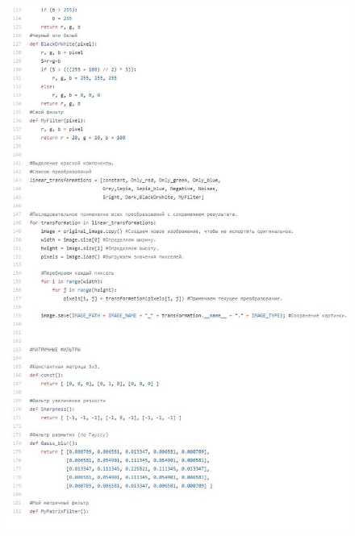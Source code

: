 \documentclass[a4paper,12pt]{article}
\begin{document}

\newpage
\begin{figure}
\begin{center}
\begin{minipage}[h]{1\linewidth}
\includegraphics[width=1\linewidth]{code_3}
\end{minipage}
\end{center}

\end{figure}

\end{document}
